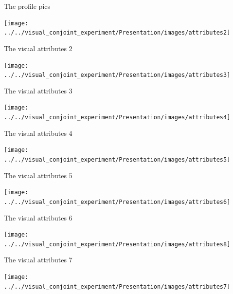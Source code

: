 \documentclass[
  ignorenonframetext,
]{beamer}
\begin{document}
\begin{frame}{The profile pics}
\label{the-profile-pics}
\begin{center}\texttt{[image: ../../visual\_conjoint\_experiment/Presentation/images/attributes2]} \end{center}
\end{frame}

\begin{frame}{The visual attributes 2}
\label{the-visual-attributes-2}
\begin{center}\texttt{[image: ../../visual\_conjoint\_experiment/Presentation/images/attributes3]} \end{center}
\end{frame}

\begin{frame}{The visual attributes 3}
\label{the-visual-attributes-3}
\begin{center}\texttt{[image: ../../visual\_conjoint\_experiment/Presentation/images/attributes4]} \end{center}
\end{frame}

\begin{frame}{The visual attributes 4}
\label{the-visual-attributes-4}
\begin{center}\texttt{[image: ../../visual\_conjoint\_experiment/Presentation/images/attributes5]} \end{center}
\end{frame}

\begin{frame}{The visual attributes 5}
\label{the-visual-attributes-5}
\begin{center}\texttt{[image: ../../visual\_conjoint\_experiment/Presentation/images/attributes6]} \end{center}
\end{frame}

\begin{frame}{The visual attributes 6}
\label{the-visual-attributes-6}
\begin{center}\texttt{[image: ../../visual\_conjoint\_experiment/Presentation/images/attributes8]} \end{center}
\end{frame}

\begin{frame}{The visual attributes 7}
\label{the-visual-attributes-7}
\begin{center}\texttt{[image: ../../visual\_conjoint\_experiment/Presentation/images/attributes7]} \end{center}
\end{frame}
\end{document}
